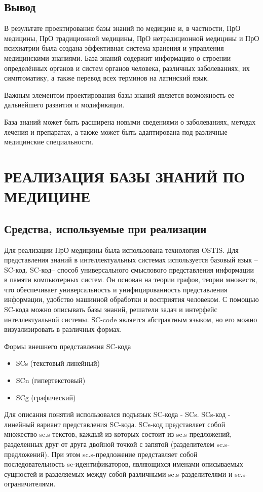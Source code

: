 \subsection{Вывод}
В результате проектирования базы знаний по медицине и, в частности,
ПрО медицины, ПрО традиционной медицины, ПрО нетрадиционной медицины и ПрО психиатрии была создана эффективная система хранения и управления медицинскими знаниями. База знаний содержит
информацию о строении определённых органов и систем органов человека, различных заболеваниях, их симптоматику, а также перевод всех терминов на латинский язык.

Важным элементом проектирования базы знаний является возможность ее дальнейшего развития и модификации.

База знаний может быть расширена новыми сведениями о заболеваниях, методах лечения и препаратах, а также может быть адаптирована под различные медицинские специальности.


\section{РЕАЛИЗАЦИЯ БАЗЫ ЗНАНИЙ ПО МЕДИЦИНЕ}
\subsection{Средства, используемые при реализации}
Для реализации ПрО медицины была использована технология OSTIS. Для представления знаний в интеллектуальных системах используется базовый язык – SC-код. SC-код-- способ универсального смыслового представления информации в памяти компьютерных систем. Он основан на теории графов, теории множеств, что обеспечивает универсальность и унифицированность представления информации, удобство машинной обработки и восприятия человеком. С помощью SC-кода можно описывать базы знаний, решатели задач и интерфейс интеллектуальной системы. SC-code является абстрактным языком, но его можно визуализировать в различных формах.\cite{OSTIS}

Формы внешнего представления SC-кода
\begin{itemize}
	\item {SCs (текстовый линейный)}
	\item {SCn (гипертекстовый)}
	\item {SCg (графический)}
\end{itemize}
 

Для описания понятий использовался подъязык SC-кода - SCs.
SCs-код - линейный вариант представления SC-кода. SCs-код представляет собой множество sc.s-текстов, каждый из которых состоит из sc.s-предложений, разделенных друг от друга двойной точкой с запятой (разделителем sc.s-предложений). При этом sc.s-предложение представляет собой последовательность sc-идентификаторов, являющихся именами описываемых сущностей и разделяемых между собой различными sc.s-разделителями и sc.s-ограничителями.

